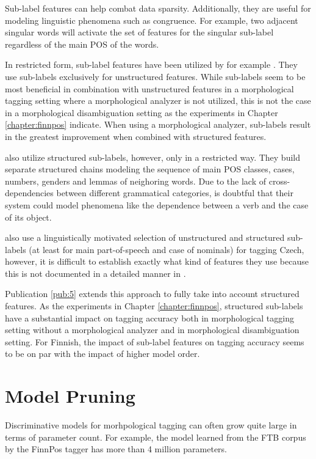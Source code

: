 Sub-label features can help combat data sparsity. Additionally, they
are useful for modeling linguistic phenomena such as congruence. For
example, two adjacent singular words will activate the set of features
for the singular sub-label regardless of the main POS of the words.

In restricted form, sub-label features have been utilized by for
example \cite{Muller2013}. They use sub-labels
exclusively for unstructured features. While sub-labels seem to be
most beneficial in combination with unstructured features in a
morphological tagging setting where a morphological analyzer is not
utilized, this is not the case in a morphological disambiguation
setting as the experiments in Chapter \ref{chapter:finnpos}
indicate. When using a morphological analyzer, sub-labels result in
the greatest improvement when combined with structured features.

\cite{Smith2005} also utilize structured sub-labels, however, only in
a restricted way. They build separate structured chains modeling the
sequence of main POS classes, cases, numbers, genders and lemmas of
neighoring words. Due to the lack of cross-dependencies between
different grammatical categories, is doubtful that their system could
model phenomena like the dependence between a verb and the case of its
object. 

\cite{Spoustova2009} also use a linguistically motivated selection of
unstructured and structured sub-labels (at least for main
part-of-speech and case of nominals) for tagging Czech, however, it is
difficult to establish exactly what kind of features they use because
this is not documented in a detailed manner in \cite{Spoustova2009}.
 
Publication \ref{pub:5} extends this approach to fully take
into account structured features. As the experiments in Chapter
\ref{chapter:finnpos}, structured sub-labels have a substantial impact
on tagging accuracy both in morphological tagging setting without a
morphological analyzer and in morphological disambiguation
setting. For Finnish, the impact of sub-label features on tagging
accuracy seems to be on par with the impact of higher model order.

\section{Model Pruning}\label{sec:pruning}

Discriminative models for morhpological tagging can often grow quite
large in terms of parameter count. For example, the model learned from
the FTB corpus by the FinnPos tagger has more than 4 million
parameters.

